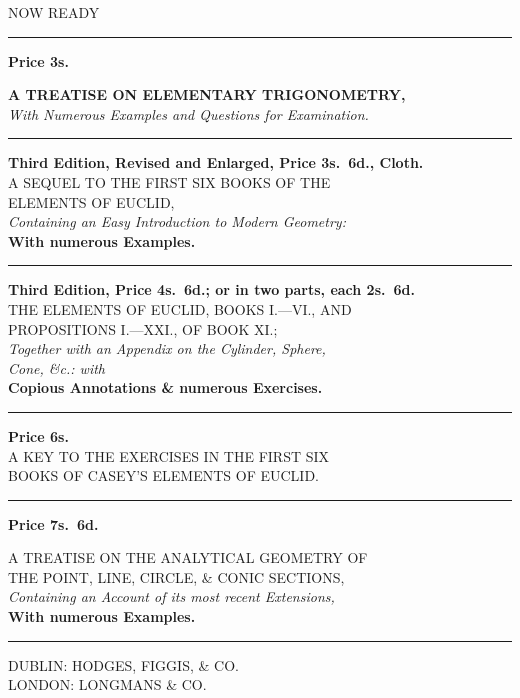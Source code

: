 \documentclass[oneside]{book}
\begin{document}
\begin{center}
{\large \textsf{NOW READY}}

\medskip
\rule{0.5in}{1pt}
\medskip

\textbf{Price 3s.}

\textbf{A TREATISE ON ELEMENTARY TRIGONOMETRY,}\\
\emph{With Numerous Examples and Questions for Examination.}


\medskip
\rule{1in}{1pt}
\medskip

{\small\textbf{Third Edition, Revised and Enlarged, Price 3s.\ 6d., Cloth.}} \\
A SEQUEL TO THE FIRST SIX BOOKS OF THE \\
ELEMENTS OF EUCLID, \\
\emph{Containing an Easy Introduction to Modern Geometry:} \\
\textbf{With numerous Examples.}

\medskip
\rule{1in}{1pt}
\medskip

{\small\textbf{Third Edition, Price 4s.\ 6d.; or in two parts, each 2s.\ 6d.}} \\
THE ELEMENTS OF EUCLID, BOOKS I.---VI\@., AND \\
PROPOSITIONS I.---XXI\@., OF BOOK XI\@.; \\
\emph{Together with an Appendix on the Cylinder, Sphere, \\
Cone, \&c.: with} \\
\textbf{Copious Annotations \& numerous Exercises.}

\medskip
\rule{1in}{1pt}
\medskip

\textbf{Price 6s.} \\
A KEY TO THE EXERCISES IN THE FIRST SIX \\
BOOKS OF CASEY'S ELEMENTS OF EUCLID.

\medskip
\rule{1in}{1pt}
\medskip

\textbf{Price 7s.\ 6d.}

A TREATISE ON THE ANALYTICAL GEOMETRY OF \\
THE POINT, LINE, CIRCLE, \& CONIC SECTIONS, \\
\emph{Containing an Account of its most recent Extensions,} \\
\textbf{With numerous Examples.}

\medskip
\rule{1in}{1pt}
\medskip

DUBLIN: HODGES, FIGGIS, \& CO. \\
LONDON: LONGMANS \& CO.
\end{center}
\vfill
\end{document}
